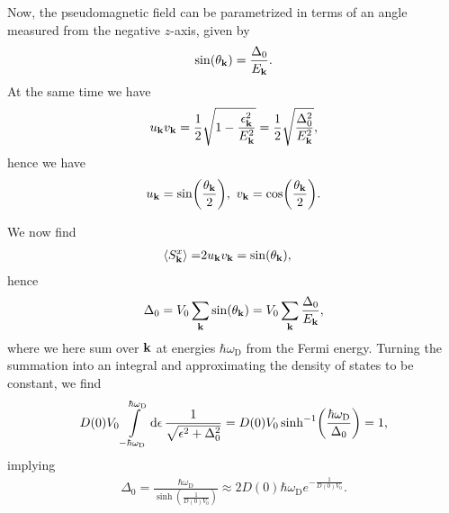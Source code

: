 Now, the pseudomagnetic field can be parametrized in terms of an angle measured from the negative $z$-axis, given by
\begin{align*}
	\sin(\theta_{\vb{k}}) = \frac{\Delta_{0}}{E_{\vb{k}}}.
\end{align*}
At the same time we have
\begin{align*}
	u_{\vb{k}}v_{\vb{k}} = \frac{1}{2}\sqrt{1 - \frac{\epsilon_{\vb{k}}^{2}}{E_{\vb{k}}^{2}}} = \frac{1}{2}\sqrt{\frac{\Delta_{0}^{2}}{E_{\vb{k}}^{2}}},
\end{align*}
hence we have
\begin{align*}
	u_{\vb{k}} = \sin(\frac{\theta_{\vb{k}}}{2}),\ v_{\vb{k}} = \cos(\frac{\theta_{\vb{k}}}{2}).
\end{align*}

We now find
\begin{align*}
	\expval{S_{\vb{k}}^{x}} =& 2u_{\vb{k}}v_{\vb{k}} = \sin(\theta_{\vb{k}}),
\end{align*}
hence
\begin{align*}
	\Delta_{0} = V_{0}\sum\limits_{\vb{k}}\sin(\theta_{\vb{k}}) = V_{0}\sum\limits_{\vb{k}}\frac{\Delta_{0}}{E_{\vb{k}}},
\end{align*}
where we here sum over $\vb{k}$ at energies $\hbar\omega_{\text{D}}$ from the Fermi energy. Turning the summation into an integral and approximating the density of states to be constant, we find
\begin{align*}
	D(0)V_{0}\int\limits_{-\hbar\omega_{\text{D}}}^{\hbar\omega_{\text{D}}}\dd{\epsilon}\frac{1}{\sqrt{\epsilon^{2} + \Delta_{0}^{2}}} = D(0)V_{0}\sinh[-1](\frac{\hbar\omega_{\text{D}}}{\Delta_{0}}) = 1,
\end{align*}
implying
\begin{align*}
	\Delta_{0} = \frac{\hbar\omega_{\text{D}}}{\sinh(\frac{1}{D(0)V_{0}})} \approx 2D(0)\hbar\omega_{\text{D}}e^{-\frac{1}{D(0)V_{0}}}.
\end{align*}

